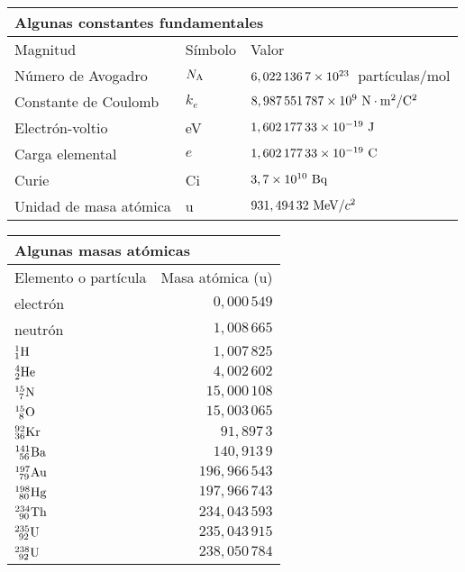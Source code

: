 \documentclass[11pt]{articulo}
\begin{document}
\begingroup
\renewcommand{\arraystretch}{1.5} %
\begin{tabular}{lll}
\multicolumn{3}{l}{Algunas constantes fundamentales}\\
\hline
Magnitud & S\'imbolo & Valor\\
\hline
N\'umero de Avogadro     & $N_{\rm A}$ & ${\rm 6,022\,136\,7 \times 10^{23}}$~part\'iculas/mol\\
Constante de Coulomb     & $k_e$       & ${\rm 8,987\,551\,787 \times 10^9~N \cdot m^2 / C^2}$\\
Electr\'on-voltio        & eV          & ${\rm 1,602\,177\,33 \times 10^{-19}~J}$\\
Carga elemental          & $e$         & ${\rm 1,602\,177\,33 \times 10^{-19}~C}$\\
Curie                    & Ci          & ${\rm 3,7 \times 10^{10}~Bq}$\\
Unidad de masa at\'omica & u           & $931,494\,32~{\rm MeV}/c^2$\\
\hline
\end{tabular}
\endgroup

\vspace*{0.5cm}

\begingroup
\renewcommand{\arraystretch}{1.5} %
\begin{tabular}{lr}
\multicolumn{2}{l}{Algunas masas at\'omicas}\\
\hline
Elemento o part\'icula & Masa at\'omica (u)\\
\hline
electr\'on             & $  0,000\,549$\\
neutr\'on              & $  1,008\,665$\\
${\rm _{1}^{1}H}$      & $  1,007\,825$\\
${\rm _{2}^{4}He}$     & $  4,002\,602$\\
${\rm _{~7}^{15}N}$    & $ 15,000\,108$\\
${\rm _{~8}^{15}O}$    & $ 15,003\,065$\\
${\rm _{36}^{92}Kr}$   & $ 91,897\,3$\\
${\rm _{~56}^{141}Ba}$ & $140,913\,9$\\
${\rm _{~79}^{197}Au}$ & $196,966\,543$\\
${\rm _{~80}^{198}Hg}$ & $197,966\,743$\\
${\rm _{~90}^{234}Th}$ & $234,043\,593$\\
${\rm _{~92}^{235}U}$  & $235,043\,915$\\
${\rm _{~92}^{238}U}$  & $238,050\,784$\\
\hline
\end{tabular}
\endgroup
\end{document}
